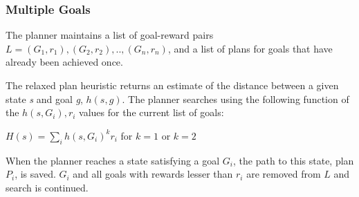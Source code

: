 \documentclass{article}
\begin{document}
\subsubsection{Multiple Goals}

The planner maintains a list of goal-reward pairs $L={(G_{1},r_{1}),(G_{2},r_{2}),..,(G_{n},r_{n})}$,
and a list of plans for goals that have already been achieved once.

The relaxed plan heuristic returns an estimate of the distance between
a given state \emph{s} and goal \emph{g}, $h(s,g)$. The planner searches
using the following function of the $h(s,G_{i}),r_{i}$ values for
the current list of goals:

$H(s)=\sum_{i}h(s,G_{i})^{k}r_{i}$ for $k=1$ or $k=2$

When the planner reaches a state satisfying a goal $G_{i}$, the path
to this state, plan $P_{i}$, is saved. $G_{i}$ and all goals with
rewards lesser than $r_{i}$ are removed from $L$ and search is continued.





\end{document}
